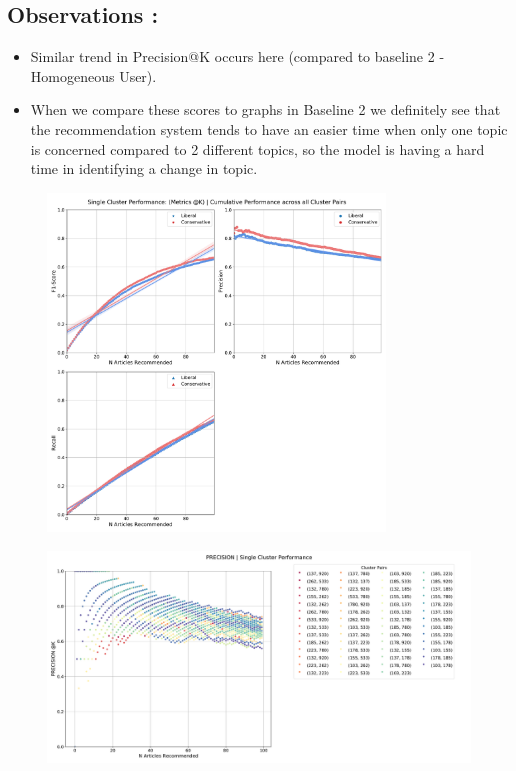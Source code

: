 \documentclass[a4paper,fontsize=8.0pt]{scrartcl}
\begin{document}
\subsection{Observations :}
\begin{flushleft}
\begin{itemize}
    \item Similar trend in Precision@K occurs here (compared to baseline 2 - Homogeneous User). 
    \item  When we compare these scores to graphs in Baseline 2 we definitely see that the recommendation system tends to have an easier time when only one topic is concerned compared to 2 different topics, so the model is having a hard time in identifying a change in topic.
\end{itemize}
\end{flushleft}
\begin{figure}[H]
 \includegraphics[width=0.8\textwidth]{Graphs/user_interaction_vs_model_performance_cumu_single_cluster.pdf}
\end{figure}
\begin{figure}[H]
 \includegraphics[width=1.0\textwidth]{Graphs/user_interaction_vs_model_performance_precision_all_cps_single_cluster.pdf}
\end{figure}
\end{document}

